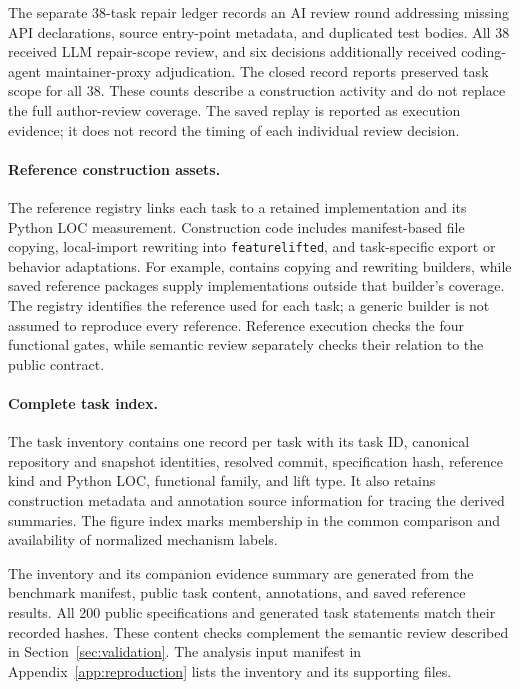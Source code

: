 \documentclass[acmsmall,screen,review,anonymous,nonacm]{acmart}
\begin{document}
The separate 38-task repair ledger records an AI review round addressing
missing API declarations, source entry-point metadata, and duplicated test
bodies. All 38 received LLM repair-scope review, and six decisions additionally
received coding-agent maintainer-proxy adjudication. The closed record reports
preserved task scope for all 38. These counts describe a construction activity and do not replace
the full author-review coverage. The saved replay is reported as execution
evidence; it does not record the timing of each individual review decision.

\paragraph{Reference construction assets.}
The reference registry links each task to a retained implementation and its
Python LOC measurement. Construction code includes manifest-based file copying,
local-import rewriting into \texttt{featurelifted}, and task-specific export
or behavior adaptations. For example, 
contains copying and rewriting builders, while saved reference packages supply
implementations outside that builder's coverage. The registry identifies the
reference used for each task; a generic builder is not assumed to reproduce
every reference. Reference execution checks the four functional gates, while
semantic review separately checks their relation to the public contract.

\paragraph{Complete task index.}
The task inventory contains one record per task with its task ID, canonical
repository and snapshot identities, resolved commit, specification hash,
reference kind and Python LOC, functional family, and lift type. It also
retains construction metadata and annotation source information for tracing
the derived summaries. The figure index marks membership in the common
comparison and availability of normalized mechanism labels.

The inventory and its companion evidence summary are generated from the
benchmark manifest, public task content, annotations, and saved reference
results. All 200 public specifications and generated task statements match
their recorded hashes. These content checks complement the semantic review
described in Section~\ref{sec:validation}. The analysis input manifest in
Appendix~\ref{app:reproduction} lists the inventory and its supporting files.
\end{document}
